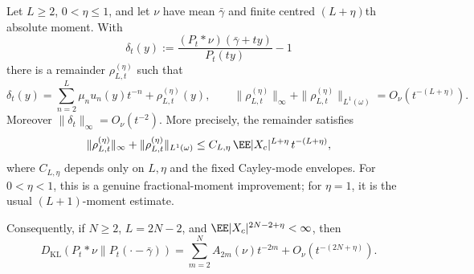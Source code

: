 \begin{lemma}
\label{lem:positive-margin-quotient-remainder}
\label{rem:positive-margin-retained-order}
\label{prop:density-to-entropy-descent}
\label{lem:closed-cayley-mode-constant-envelopes}
Let \(L\ge2\), \(0<\eta\le1\), and let \(\nu\) have mean
\(\bar{\gamma}\) and finite centred \((L+\eta)\)th absolute moment.  With
\[
\delta_t(y):=
\frac{(P_t*\nu)(\bar{\gamma}+ty)}{P_t(ty)}-1
\]
there is a remainder \(\rho_{L,t}^{(\eta)}\) such that
\begin{equation}\label{eq:positive-margin-density-remainder}
\delta_t(y)=
\sum_{n=2}^{L}\mu_nu_n(y)t^{-n}+\rho_{L,t}^{(\eta)}(y),
\qquad
\|\rho_{L,t}^{(\eta)}\|_{\infty}
+\|\rho_{L,t}^{(\eta)}\|_{L^1(\omega)}
=O_\nu(t^{-(L+\eta)}).
\end{equation}
Moreover \(\|\delta_t\|_\infty=O_\nu(t^{-2})\).
More precisely, the remainder satisfies
\[
\|\rho_{L,t}^{(\eta)}\|_{\infty}
+\|\rho_{L,t}^{(\eta)}\|_{L^1(\omega)}
\le
C_{L,\eta}\,\EE|X_c|^{L+\eta}\,t^{-(L+\eta)},
\]
where \(C_{L,\eta}\) depends only on \(L,\eta\) and the fixed Cayley-mode
envelopes.  For \(0<\eta<1\), this is a genuine fractional-moment
improvement; for \(\eta=1\), it is the usual \((L+1)\)-moment estimate.

Consequently, if \(N\ge2\), \(L=2N-2\), and
\(\EE|X_c|^{2N-2+\eta}<\infty\), then
\begin{equation}\label{eq:positive-margin-retained-order-theorem}
D_{\mathrm{KL}}(P_t*\nu\|P_t(\cdot-\bar{\gamma}))
=\sum_{m=2}^{N}A_{2m}(\nu)t^{-2m}
+O_\nu(t^{-(2N+\eta)}).
\end{equation}
\label{eq:explicit-entropy-constant-bound}
\end{lemma}

